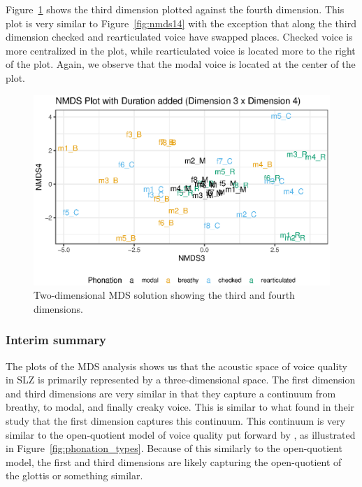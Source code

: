 Figure~\ref{fig:nmds34} shows the third dimension plotted against the fourth dimension. This plot is very similar to Figure~\ref{fig:nmds14} with the exception that along the third dimension checked and rearticulated voice have swapped places. Checked voice is more centralized in the plot, while rearticulated voice is located more to the right of the plot. Again, we observe that the modal voice is located at the center of the plot.

\begin{figure}[!h]
    \centering
    \includegraphics[width = 0.9\linewidth]{images/MDS/nmds34_dur.eps}
    \caption{Two-dimensional MDS solution showing the third and fourth dimensions.}
    \label{fig:nmds34}
\end{figure}

\subsubsection{Interim summary} \label{sec:acousticlandscape:inter_sum}

The plots of the MDS analysis shows us that the acoustic space of voice quality in SLZ is primarily represented by a three-dimensional space. The first dimension and third dimensions are very similar in that they capture a continuum from breathy, to modal, and finally creaky voice. This is similar to what \citet{keatingCrosslanguageAcousticSpace2023} found in their study that the first dimension captures this continuum. This continuum is very similar to the open-quotient model of voice quality put forward by \citet{gordonPhonationTypesCrosslinguistic2001}, as illustrated in Figure~\ref{fig:phonation_types}. Because of this similarly to the open-quotient model, the first and third dimensions are likely capturing the open-quotient of the glottis or something similar. 


